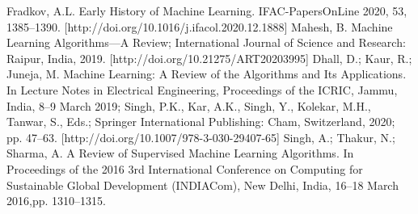 \documentclass[conference]{IEEEtran}
\begin{document}
\begin{thebibliography}{00}
 Fradkov, A.L. Early History of Machine Learning. IFAC-PapersOnLine 2020, 53, 1385–1390. [http://doi.org/10.1016/j.ifacol.2020.12.1888]
 Mahesh, B. Machine Learning Algorithms—A Review; International Journal of Science and Research: Raipur, India, 2019. [http://doi.org/10.21275/ART20203995]
 Dhall, D.; Kaur, R.; Juneja, M. Machine Learning: A Review of the Algorithms and Its Applications. In Lecture Notes in Electrical
Engineering, Proceedings of the ICRIC, Jammu, India, 8–9 March 2019; Singh, P.K., Kar, A.K., Singh, Y., Kolekar, M.H., Tanwar, S., Eds.;
Springer International Publishing: Cham, Switzerland, 2020; pp. 47–63. [http://doi.org/10.1007/978-3-030-29407-65]
 Singh, A.; Thakur, N.; Sharma, A. A Review of Supervised Machine Learning Algorithms. In Proceedings of the 2016 3rd
International Conference on Computing for Sustainable Global Development (INDIACom), New Delhi, India, 16–18 March 2016,pp. 1310–1315.
\end{thebibliography}
\end{document}
